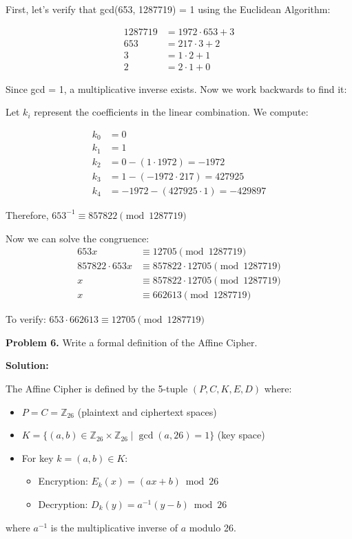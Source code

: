 \documentclass[12pt]{article}
\begin{document}
First, let's verify that gcd(653, 1287719) = 1 using the Euclidean Algorithm:

\begin{align*}
1287719 &= 1972 \cdot 653 + 3 \\
653 &= 217 \cdot 3 + 2 \\
3 &= 1 \cdot 2 + 1 \\
2 &= 2 \cdot 1 + 0
\end{align*}

Since gcd = 1, a multiplicative inverse exists. Now we work backwards to find it:

Let $k_i$ represent the coefficients in the linear combination. We compute:

\begin{align*}
k_0 &= 0 \\
k_1 &= 1 \\
k_2 &= 0 - (1 \cdot 1972) = -1972 \\
k_3 &= 1 - (-1972 \cdot 217) = 427925 \\
k_4 &= -1972 - (427925 \cdot 1) = -429897
\end{align*}

Therefore, $653^{-1} \equiv 857822 \pmod{1287719}$

Now we can solve the congruence:
\begin{align*}
653x &\equiv 12705 \pmod{1287719} \\
857822 \cdot 653x &\equiv 857822 \cdot 12705 \pmod{1287719} \\
x &\equiv 857822 \cdot 12705 \pmod{1287719} \\
x &\equiv 662613 \pmod{1287719}
\end{align*}

To verify: $653 \cdot 662613 \equiv 12705 \pmod{1287719}$

\newpage
\noindent\textbf{Problem 6.} Write a formal definition of the Affine Cipher.

\vspace{1em}
\textbf{Solution:}

The Affine Cipher is defined by the 5-tuple $(P, C, K, E, D)$ where:

\begin{itemize}
    \item $P = C = \mathbb{Z}_{26}$ (plaintext and ciphertext spaces)
    \item $K = \{(a,b) \in \mathbb{Z}_{26} \times \mathbb{Z}_{26} \mid \gcd(a,26) = 1\}$ (key space)
    \item For key $k = (a,b) \in K$:
    \begin{itemize}
        \item Encryption: $E_k(x) = (ax + b) \bmod 26$
        \item Decryption: $D_k(y) = a^{-1}(y - b) \bmod 26$
    \end{itemize}
\end{itemize}

where $a^{-1}$ is the multiplicative inverse of $a$ modulo 26.
\end{document}
